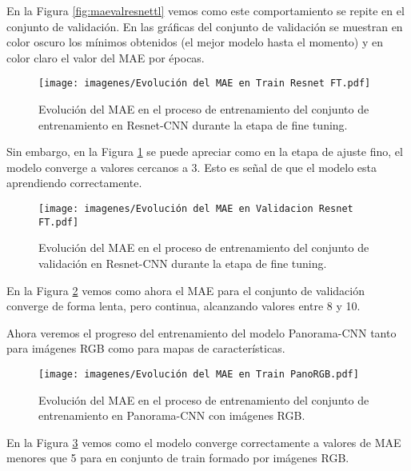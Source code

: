 \newpage

En la Figura \ref{fig:maevalresnettl} vemos como este comportamiento se repite en el conjunto de validación. En las gráficas del conjunto de validación se muestran en color oscuro los mínimos obtenidos (el mejor modelo hasta el momento) y en color claro el valor del MAE por épocas.

\begin{figure}[ht]
    \centering
    \texttt{[image: imagenes/Evolución del MAE en Train Resnet FT.pdf]}
    \caption[Evolución del MAE en el conjunto de entrenamiento en Resnet-CNN durante fine tuning.]{Evolución del MAE en el proceso de entrenamiento del conjunto de entrenamiento en Resnet-CNN durante la etapa de fine tuning.}
    \label{fig:maetrainresnetft}
\end{figure}

Sin embargo, en la Figura \ref{fig:maetrainresnetft} se puede apreciar como en la etapa de ajuste fino, el modelo converge a valores cercanos a 3. Esto es señal de que el modelo esta aprendiendo correctamente.

\begin{figure}[ht]
    \centering
    \texttt{[image: imagenes/Evolución del MAE en Validacion Resnet FT.pdf]}
    \caption[Evolución del MAE en el conjunto de validación en Resnet-CNN durante fine tuning.]{Evolución del MAE en el proceso de entrenamiento del conjunto de validación en Resnet-CNN durante la etapa de fine tuning.}
    \label{fig:maevalresnetft}
\end{figure}

En la Figura \ref{fig:maevalresnetft} vemos como ahora el MAE para el conjunto de validación converge de forma lenta, pero continua, alcanzando valores entre 8 y 10.

Ahora veremos el progreso del entrenamiento del modelo Panorama-CNN tanto para imágenes RGB como para mapas de características.

\begin{figure}[ht]
    \centering
    \texttt{[image: imagenes/Evolución del MAE en Train PanoRGB.pdf]}
    \caption[Evolución del MAE en el conjunto de entrenamiento en Panorama-CNN con imágenes RGB.]{Evolución del MAE en el proceso de entrenamiento del conjunto de entrenamiento en Panorama-CNN con imágenes RGB.}
    \label{fig:maetrainpanorgb}
\end{figure}

En la Figura \ref{fig:maetrainpanorgb} vemos como el modelo converge correctamente a valores de MAE menores que 5 para en conjunto de train formado por imágenes RGB.

